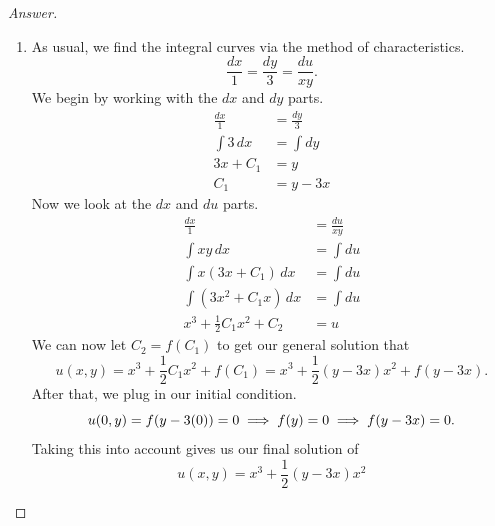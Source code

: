 \documentclass{article}
\theoremstyle{definition}
\renewcommand\qedsymbol{$\blacksquare$}
\newenvironment{ans}{\begin{proof}[Answer]\renewcommand{\qedsymbol}{}}{\end{proof}}
\begin{document}
	\begin{ans}
		\begin{enumerate}[resume*=answers]
			\item As usual, we find the integral curves via the method of characteristics.
                \[\frac{dx}{1} = \frac{dy}{3} = \frac{du}{xy}.\]
                We begin by working with the $dx$ and $dy$ parts.
                \begin{align*}
                    \frac{dx}{1} &= \frac{dy}{3}\\
                    \int 3\,dx &= \int dy\\
                    3x + C_1 &= y\\
                    C_1 &= y - 3x
                \end{align*}
                Now we look at the $dx$ and $du$ parts.
                \begin{align*}
                    \frac{dx}{1} &= \frac{du}{xy}\\
                    \int xy\,dx &= \int du\\
                    \int x(3x+C_1)\,dx &= \int du\tag{substituting for $y$}\\
                    \int (3x^2 + C_1x)\,dx &= \int du\\
                    x^3 + \frac{1}{2}C_1x^2 + C_2 &= u
                \end{align*}
			    We can now let $C_2 = f(C_1)$ to get our general solution that
                \[u(x,y) = x^3 + \frac{1}{2}C_1x^2 + f(C_1) = x^3 + \frac{1}{2}(y - 3x)x^2 + f(y - 3x).\]
                After that, we plug in our initial condition.
                \begin{equation*}
                    u(0,y) = f(y-3(0)) = 0\\
                    \implies f(y) = 0\\
                    \implies f(y-3x) = 0.
                \end{equation*}
                Taking this into account gives us our final solution of
                \[\boxed{u(x,y) = x^3 + \frac{1}{2}(y-3x)x^2}\]
                

\end{enumerate}
\end{ans}
\end{document}
